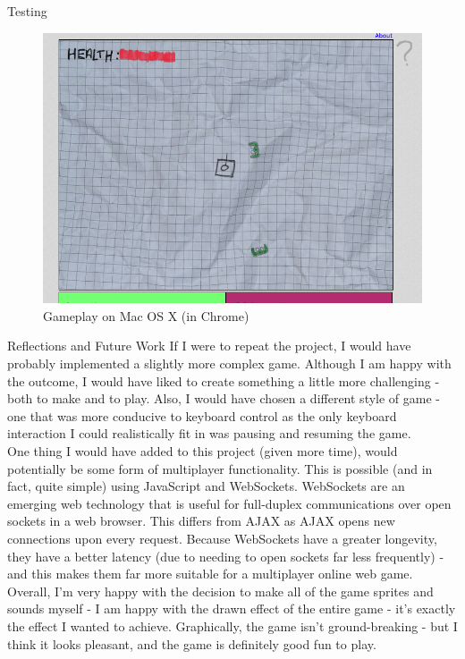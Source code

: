 \documentclass[11pt]{article}
\begin{document}
\begin{section}{Testing}
		\begin{figure}[htp]
			\centering
			\includegraphics[height=0.6\columnwidth]{img/osx}
			\caption{Gameplay on Mac OS X (in Chrome)}
		\end{figure}
	\end{section}
    
\clearpage
\begin{section}{Reflections and Future Work}
    		If I were to repeat the project, I would have probably implemented a slightly more complex game. Although I am happy with the outcome, I would have liked to create something a little more challenging - both to make and to play. Also, I would have chosen a different style of game - one that was more conducive to keyboard control as the only keyboard interaction I could realistically fit in was pausing and resuming the game. \\
    		
    		One thing I would have added to this project (given more time), would potentially be some form of multiplayer functionality. This is possible (and in fact, quite simple) using JavaScript and WebSockets. WebSockets are an emerging web technology that is useful for full-duplex communications over open sockets in a web browser\cite{WebSockets}. This differs from AJAX as AJAX opens new connections upon every request. Because WebSockets have a greater longevity, they have a better latency (due to needing to open sockets far less frequently) - and this makes them far more suitable for a multiplayer online web game. \\
    		
    		Overall, I'm very happy with the decision to make all of the game sprites and sounds myself - I am happy with the drawn effect of the entire game - it's exactly the effect I wanted to achieve. Graphically, the game isn't ground-breaking - but I think it looks pleasant, and the game is definitely good fun to play.
\end{section}
\end{document}
